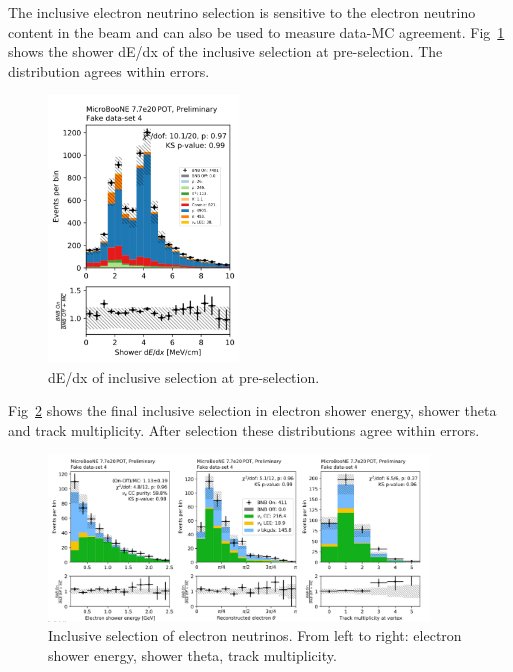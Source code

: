 The inclusive electron neutrino selection is sensitive to the electron neutrino content in the beam and can also be used to measure data-MC agreement.  Fig~\ref{fig:fakedata:set4:inc_presel} shows the shower dE/dx of the inclusive selection at pre-selection.  The distribution agrees within errors.   

\begin{figure}[H]
\begin{center}
\includegraphics[width=0.45\textwidth]{Fakedata/set4/inc_presel.pdf}
\caption{\label{fig:fakedata:set4:inc_presel} dE/dx of inclusive selection at pre-selection.}
\end{center}
\end{figure}

Fig~\ref{fig:fakedata:set4:inc_postsel} shows the final inclusive selection in electron shower energy, shower theta and track multiplicity.  After selection these distributions agree within errors.

\begin{figure}[H]
\begin{center}
\includegraphics[width=0.9\textwidth]{Fakedata/set4/incl_postsel.pdf}
\caption{\label{fig:fakedata:set4:inc_postsel} Inclusive selection of electron neutrinos. From left to right: electron shower energy, shower theta, track multiplicity.}
\end{center}
\end{figure}

